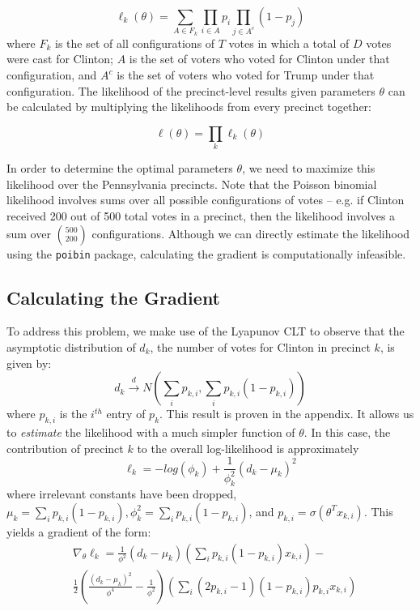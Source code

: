 \documentclass[10pt, letterpaper]{article}
\begin{document}
\begin{multicols}{2}
$$\ell_k(\theta) = \sum_{A \in F_k} \prod_{i \in A} p_i \prod_{j \in A^c}(1 - p_j)$$
where $F_k$ is the set of all configurations of $T$ votes in which a total of $D$ votes were cast for Clinton; $A$ is the set of voters who voted for Clinton under that configuration, and $A^c$ is the set of voters who voted for Trump under that configuration. The likelihood of the precinct-level results given parameters $\theta$ can be calculated by multiplying the likelihoods from every precinct together:

$$\ell(\theta) = \prod_k \ell_k(\theta)$$

In order to determine the optimal parameters $\theta$, we need to maximize this likelihood over the Pennsylvania precincts. Note that the Poisson binomial likelihood involves sums over all possible configurations of votes -- e.g. if Clinton received 200 out of 500 total votes in a precinct, then the likelihood involves a sum over $500 \choose 200$ configurations. Although we can directly estimate the likelihood using the \texttt{poibin} package, calculating the gradient is computationally infeasible.

\subsection{Calculating the Gradient}

To address this problem, we make use of the Lyapunov CLT \cite{LyapunovCondition} to observe that the asymptotic distribution of $d_k$, the number of votes for Clinton in precinct $k$, is given by: 
\[ d_k \stackrel{d} \longrightarrow N \left(\sum_{i} p_{k,i}, \sum_{i} p_{k, i}(1-p_{k, i}) \right) \] 
where $p_{k, i}$ is the $i^{th}$ entry of $p_k$. This result is proven in the appendix. It allows us to \emph{estimate} the likelihood with a much simpler function of $\theta$. In this case, the contribution of precinct $k$ to the overall log-likelihood is approximately
\[ \ell_k = -log \left( \phi_k\right) + \frac{1}{\phi_k^2} \left( d_k -\mu_k \right)^2 \]
where irrelevant constants have been dropped, $\mu_k =  \sum_{i} p_{k, i}(1-p_{k, i}), \phi_k^2 = \sum_{i} p_{k, i}(1-p_{k, i})$, and $p_{k, i} = \sigma(\theta^T x_{k, i})$. This yields a gradient of the form: 
\begin{align*}
&\nabla_{\theta} \ell_k = \frac{1}{\phi^2} (d_k - \mu_k) \left( \sum_i p_{k, i} (1 - p_{k, i}) x_{k, i} \right)-\\&  \frac{1}{2} \left(\frac{(d_k - \mu_k)^2}{\phi^4} - \frac{1}{\phi^2} \right) \left( \sum_{i} (2 p_{k, i} - 1)(1-p_{k, i})p_{k, i}x_{k, i} \right)
 \end{align*}


\end{multicols}
\end{document}

